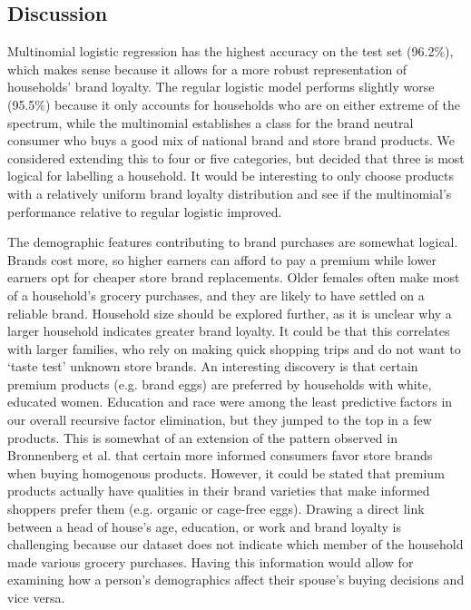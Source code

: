 \documentclass[conference]{IEEEtran}
\begin{document}
\subsection{Discussion}
Multinomial logistic regression has the highest accuracy on the test set (96.2\%), which makes sense because it allows for a more robust representation of households’ brand loyalty. The regular logistic model performs slightly worse (95.5\%) because it only accounts for households who are on either extreme of the spectrum, while the multinomial establishes a class for the brand neutral consumer who buys a good mix of national brand and store brand products. We considered extending this to four or five categories, but decided that three is most logical for labelling a household. It would be interesting to only choose products with a relatively uniform brand loyalty distribution and see if the multinomial’s performance relative to regular logistic improved.


The demographic features contributing to brand purchases are somewhat logical. Brands cost more, so higher earners can afford to pay a premium while lower earners opt for cheaper store brand replacements. Older females often make most of a household’s grocery purchases, and they are likely to have settled on a reliable brand. Household size should be explored further, as it is unclear why a larger household indicates greater brand loyalty. It could be that this correlates with larger families, who rely on making quick shopping trips and do not want to `taste test' unknown store brands. 
An interesting discovery is that certain premium products (e.g. brand eggs) are preferred by households with white, educated women. Education and race were among the least predictive factors in our overall recursive factor elimination, but they jumped to the top in a few products. This is somewhat of an extension of the pattern observed in Bronnenberg et al.\cite{bronnenberg2014pharmacists} that certain more informed consumers favor store brands when buying homogenous products. However, it could be stated that premium products actually have qualities in their brand varieties that make informed shoppers prefer them (e.g. organic or cage-free eggs).
Drawing a direct link between a head of house’s age, education, or work and brand loyalty is challenging because our dataset does not indicate which member of the household made various grocery purchases. Having this information would allow for examining how a person’s demographics affect their spouse’s buying decisions and vice versa.
\end{document}
